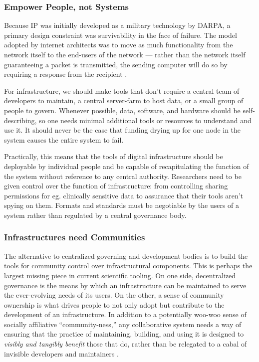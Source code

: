 \documentclass[11pt]{article}
\begin{document}
\begin{multicols}{2}
\hypertarget{empower-people-not-systems}{%
\subsubsection{Empower People, not
Systems}\label{empower-people-not-systems}}

Because IP was initially developed as a military technology by DARPA, a
primary design constraint was survivability in the face of failure. The
model adopted by internet architects was to move as much functionality
from the network itself to the end-users of the network --- rather than
the network itself guaranteeing a packet is transmitted, the sending
computer will do so by requiring a response from the recipient \cite{clarkDesignPhilosophyDARPA1988} .

For infrastructure, we should make tools that don't require a central
team of developers to maintain, a central server-farm to host data, or a
small group of people to govern. Whenever possible, data, software, and
hardware should be self-describing, so one needs minimal additional
tools or resources to understand and use it. It should never be the case
that funding drying up for one node in the system causes the entire
system to fail.

Practically, this means that the tools of digital infrastructure should
be deployable by individual people and be capable of recapitulating the
function of the system without reference to any central authority.
Researchers need to be given control over the function of
infrastructure: from controlling sharing permissions for eg. clinically
sensitive data to assurance that their tools aren't spying on them.
Formats and standards must be negotiable by the users of a system rather
than regulated by a central governance body.

\hypertarget{infrastructures-need-communities}{%
\subsubsection{Infrastructures need
Communities}\label{infrastructures-need-communities}}

The alternative to centralized governing and development bodies is to
build the tools for community control over infrastructural components.
This is perhaps the largest missing piece in current scientific tooling.
On one side, decentralized governance is the means by which an
infrastructure can be maintained to serve the ever-evolving needs of its
users. On the other, a sense of community ownership is what drives
people to not only adopt but contribute to the development of an
infrastructure. In addition to a potentially woo-woo sense of socially
affiliative ``community-ness,'' any collaborative system needs a way of
ensuring that the practice of maintaining, building, and using it is
designed to \emph{visibly and tangibly benefit} those that do, rather
than be relegated to a cabal of invisible developers and maintainers
\cite{grudinGroupwareSocialDynamics1994
randallDistributedOntologyBuilding2011} .


\end{multicols}
\end{document}
